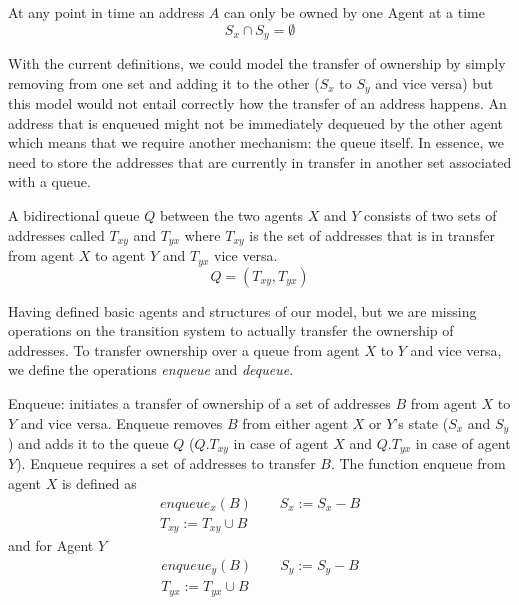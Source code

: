 \documentclass[a4paper,11pt,twoside]{report}
\begin{document}
	\begin{inv}
		At any point in time an address $A$ can only be owned by one Agent at a time
		\[ S_x \cap S_y = \emptyset \]
	\end{inv}	
	
	With the current definitions, we could model the transfer of ownership by simply removing from one
	set and adding it to the other ($S_x$ to $S_y$ and vice versa) but this model would not 
	entail correctly how the transfer of an address happens. An address that is enqueued might
	not be immediately dequeued by the other agent which means that we require another mechanism: 
	the queue itself. In essence, we need to store
	the addresses that are currently in transfer in another set associated with a queue.
	
	\begin{defi}[Queue]
		A bidirectional queue $Q$ between the two agents $X$ and $Y$ consists of two sets of addresses called 
		$T_{xy}$ and $T_{yx}$ where $T_{xy}$ is the set of addresses that is in transfer from agent $X$ 
		to agent $Y$ and $T_{yx}$ vice versa. 
		\[Q = (T_{xy}, T_{yx})\]
	\end{defi}
	
	Having defined basic agents and structures of our model, but we are missing operations 
	on the transition system to actually transfer the ownership of addresses. To transfer 
	ownership over a queue from agent $X$ to $Y$ and vice versa, we define
	the operations \textit{enqueue} and \textit{dequeue}. 
	
	\begin{op} [Enqueue]
		Enqueue: initiates a transfer of ownership of a set of addresses $B$ from agent $X$ to $Y$ and vice versa. 
		Enqueue removes $B$ from either agent $X$ or $Y$'s state ($S_x$ and $S_y$) and adds it to the 
		queue $Q$ ($Q.T_{xy}$ in case of agent $X$ and $Q.T_{yx}$ in case of agent $Y$). Enqueue requires a 
		set of addresses to transfer $B$. The function enqueue from agent $X$ is defined as
		\begin{align*} enqueue_{x}(B) \quad \quad S_x := S_x - B \\
		T_{xy} := T_{xy} \cup B  
		\end{align*}
		and for Agent $Y$
		\begin{align*} enqueue_{y}(B) \quad \quad S_y := S_y - B \\
		T_{yx} := T_{yx} \cup B 
		\end{align*}
	\end{op}
	
\end{document}
